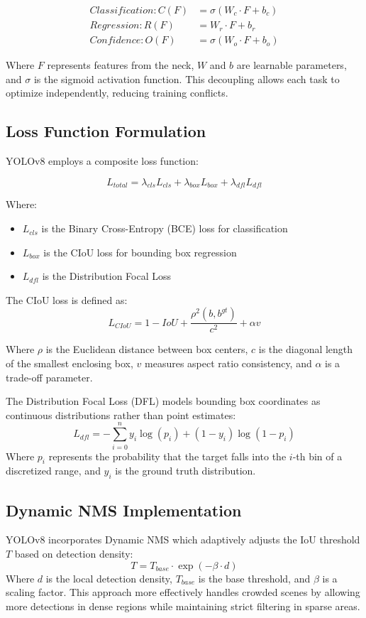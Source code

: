 \documentclass[11pt]{article}
\begin{document}
\begin{align}
Classification: C(F) &= \sigma(W_c \cdot F + b_c) \\
Regression: R(F) &= W_r \cdot F + b_r \\
Confidence: O(F) &= \sigma(W_o \cdot F + b_o)
\end{align}

Where $F$ represents features from the neck, $W$ and $b$ are learnable parameters, and $\sigma$ is the sigmoid activation function. This decoupling allows each task to optimize independently, reducing training conflicts.

\subsection{Loss Function Formulation}
YOLOv8 employs a composite loss function:

\begin{equation}
L_{total} = \lambda_{cls}L_{cls} + \lambda_{box}L_{box} + \lambda_{dfl}L_{dfl}
\end{equation}

Where:
\begin{itemize}
\item $L_{cls}$ is the Binary Cross-Entropy (BCE) loss for classification
\item $L_{box}$ is the CIoU loss for bounding box regression
\item $L_{dfl}$ is the Distribution Focal Loss
\end{itemize}

The CIoU loss is defined as:
\begin{equation}
L_{CIoU} = 1 - IoU + \frac{\rho^2(b, b^{gt})}{c^2} + \alpha v
\end{equation}

Where $\rho$ is the Euclidean distance between box centers, $c$ is the diagonal length of the smallest enclosing box, $v$ measures aspect ratio consistency, and $\alpha$ is a trade-off parameter.

The Distribution Focal Loss (DFL) models bounding box coordinates as continuous distributions rather than point estimates:
\begin{equation}
L_{dfl} = -\sum_{i=0}^{n} y_i \log(p_i) + (1-y_i)\log(1-p_i)
\end{equation}
Where $p_i$ represents the probability that the target falls into the $i$-th bin of a discretized range, and $y_i$ is the ground truth distribution.

\subsection{Dynamic NMS Implementation}
YOLOv8 incorporates Dynamic NMS which adaptively adjusts the IoU threshold $T$ based on detection density:
\begin{equation}
T = T_{base} \cdot \exp(-\beta \cdot d)
\end{equation}
Where $d$ is the local detection density, $T_{base}$ is the base threshold, and $\beta$ is a scaling factor. This approach more effectively handles crowded scenes by allowing more detections in dense regions while maintaining strict filtering in sparse areas.
\end{document}
